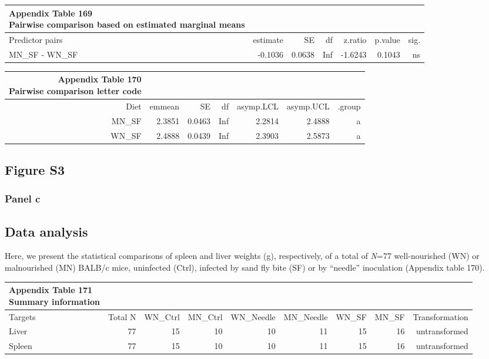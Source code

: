 \documentclass[
  12pt,
  letterpaper,
]{article}
\begin{document}
\begingroup
\fontsize{12.0pt}{14.4pt}\selectfont
\begin{longtable}{l|rrrrrr}
\caption*{
{\large \textbf{Appendix Table 169}} \\ 
{\small \textbf{Pairwise comparison based on estimated marginal means}}
} \\ 
\toprule
Predictor pairs & {estimate} & {SE} & {df} & {z.ratio} & {p.value} & {sig.} \\ 
\midrule\addlinespace[2.5pt]
MN\_SF - WN\_SF & -0.1036 & 0.0638 & Inf & -1.6243 & 0.1043 & ns \\ 
\bottomrule
\end{longtable}
\endgroup

\begingroup
\fontsize{12.0pt}{14.4pt}\selectfont
\begin{longtable}{rrrrrrr}
\caption*{
{\large \textbf{Appendix Table 170}} \\ 
{\small \textbf{Pairwise comparison letter code}}
} \\ 
\toprule
{Diet} & {emmean} & {SE} & {df} & {asymp.LCL} & {asymp.UCL} & {.group} \\ 
\midrule\addlinespace[2.5pt]
MN\_SF & 2.3851 & 0.0463 & Inf & 2.2814 & 2.4888 &  a \\ 
WN\_SF & 2.4888 & 0.0439 & Inf & 2.3903 & 2.5873 &  a \\ 
\bottomrule
\end{longtable}
\endgroup

\subsection{Figure S3}\label{figure-s3}

\subsubsection{Panel c}\label{panel-c-4}

\subsection{Data analysis}\label{data-analysis-11}

Here, we present the statistical comparisons of spleen and liver weights (g), respectively, of a total of \emph{N}=77 well-nourished (WN) or malnourished (MN) BALB/c mice, uninfected (Ctrl), infected by sand fly bite (SF) or by ``needle'' inoculation (Appendix table 170).

\begingroup
\fontsize{12.0pt}{14.4pt}\selectfont
\begin{longtable}{l|rrrrrrrr}
\caption*{
{\large \textbf{Appendix Table 171}} \\ 
{\small \textbf{Summary information}}
} \\ 
\toprule
Targets & {Total N} & WN\_Ctrl & MN\_Ctrl & WN\_Needle & MN\_Needle & WN\_SF & MN\_SF & {Transformation} \\ 
\midrule\addlinespace[2.5pt]
Liver & 77 & 15 & 10 & 10 & 11 & 15 & 16 & untransformed \\ 
Spleen & 77 & 15 & 10 & 10 & 11 & 15 & 16 & untransformed \\ 
\bottomrule
\end{longtable}
\endgroup
\end{document}
